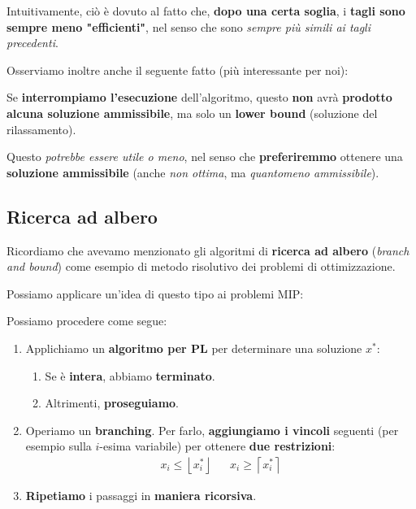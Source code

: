 \begin{remark}
    Intuitivamente, ciò è dovuto al fatto che, \textbf{dopo una certa soglia}, i
    \textbf{tagli sono sempre meno "efficienti"}, nel senso che sono 
    \textit{sempre più simili ai tagli precedenti}.
\end{remark}

Osserviamo inoltre anche il seguente fatto (più interessante per noi):

\begin{remark}
    Se \textbf{interrompiamo l'esecuzione} dell'algoritmo, questo \textbf{non}
    avrà \textbf{prodotto alcuna soluzione ammissibile}, ma solo un
    \textbf{lower bound} (soluzione del rilassamento).

    Questo \textit{potrebbe essere utile o meno}, nel senso
    che \textbf{preferiremmo} ottenere una \textbf{soluzione ammissibile}
    (anche \textit{non ottima}, ma \textit{quantomeno ammissibile}).
\end{remark}

\subsection{Ricerca ad albero}

Ricordiamo che avevamo menzionato gli algoritmi di \textbf{ricerca ad albero}
(\textit{branch and bound}) come esempio di metodo risolutivo dei problemi
di ottimizzazione.

Possiamo applicare un'idea di questo tipo ai problemi MIP:

\begin{definition}
    Possiamo procedere come segue:
    \begin{enumerate}
        \item Applichiamo un \textbf{algoritmo per PL} per determinare una soluzione
            $x^*$:
            \begin{enumerate}
                \item Se è \textbf{intera}, abbiamo \textbf{terminato}.
                \item Altrimenti, \textbf{proseguiamo}.
            \end{enumerate}
        \item Operiamo un \textbf{branching}. Per farlo, \textbf{aggiungiamo i vincoli} seguenti 
            (per esempio sulla $i$-esima variabile) per ottenere \textbf{due restrizioni}:
            \[
                \begin{aligned}
                    x_i \le \left\lfloor x_i^* \right\rfloor & & x_i \ge \left\lceil x_i^* \right\rceil 
                \end{aligned}
            \]
        \item \textbf{Ripetiamo} i passaggi in \textbf{maniera ricorsiva}.
    \end{enumerate}
\end{definition}

